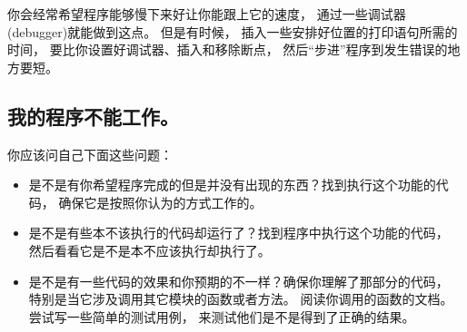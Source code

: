 你会经常希望程序能够慢下来好让你能跟上它的速度， 通过一些调试器(debugger)就能做到这点。  但是有时候， 插入一些安排好位置的打印语句所需的时间， 要比你设置好调试器、插入和移除断点， 然后“步进”程序到发生错误的地方要短。  


\subsection{我的程序不能工作。}


你应该问自己下面这些问题：

\begin{itemize}


\item 是不是有你希望程序完成的但是并没有出现的东西？找到执行这个功能的代码， 确保它是按照你认为的方式工作的。  


\item  是不是有些本不该执行的代码却运行了？找到程序中执行这个功能的代码， 然后看看它是不是本不应该执行却执行了。  


\item  是不是有一些代码的效果和你预期的不一样？确保你理解了那部分的代码， 特别是当它涉及调用其它模块的函数或者方法。  阅读你调用的函数的文档。  尝试写一些简单的测试用例， 来测试他们是不是得到了正确的结果。  

\end{itemize}

